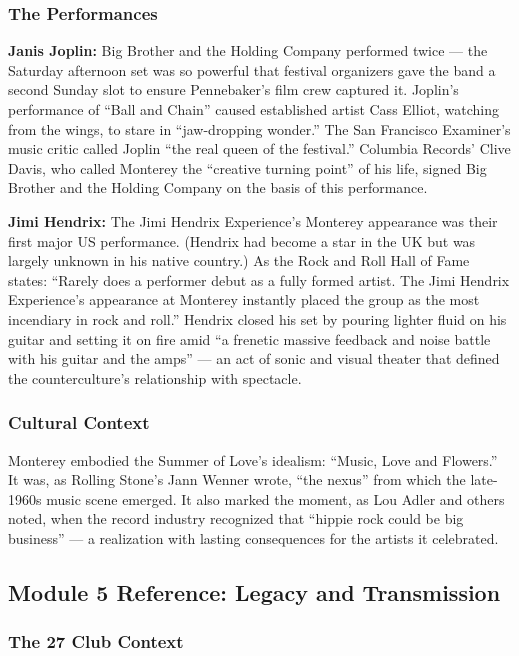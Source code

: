 \documentclass[11pt,letterpaper]{article}
\begin{document}
\subsubsection{The Performances}

\textbf{Janis Joplin:} Big Brother and the Holding Company performed twice --- the Saturday afternoon set was so powerful that festival organizers gave the band a second Sunday slot to ensure Pennebaker's film crew captured it. Joplin's performance of ``Ball and Chain'' caused established artist Cass Elliot, watching from the wings, to stare in ``jaw-dropping wonder.'' The San Francisco Examiner's music critic called Joplin ``the real queen of the festival.'' Columbia Records' Clive Davis, who called Monterey the ``creative turning point'' of his life, signed Big Brother and the Holding Company on the basis of this performance.

\textbf{Jimi Hendrix:} The Jimi Hendrix Experience's Monterey appearance was their first major US performance. (Hendrix had become a star in the UK but was largely unknown in his native country.) As the Rock and Roll Hall of Fame states: ``Rarely does a performer debut as a fully formed artist. The Jimi Hendrix Experience's appearance at Monterey instantly placed the group as the most incendiary in rock and roll.'' Hendrix closed his set by pouring lighter fluid on his guitar and setting it on fire amid ``a frenetic massive feedback and noise battle with his guitar and the amps'' --- an act of sonic and visual theater that defined the counterculture's relationship with spectacle.

\subsubsection{Cultural Context}

Monterey embodied the Summer of Love's idealism: ``Music, Love and Flowers.'' It was, as Rolling Stone's Jann Wenner wrote, ``the nexus'' from which the late-1960s music scene emerged. It also marked the moment, as Lou Adler and others noted, when the record industry recognized that ``hippie rock could be big business'' --- a realization with lasting consequences for the artists it celebrated.

\subsection{Module 5 Reference: Legacy and Transmission}

\subsubsection{The 27 Club Context}
\end{document}

